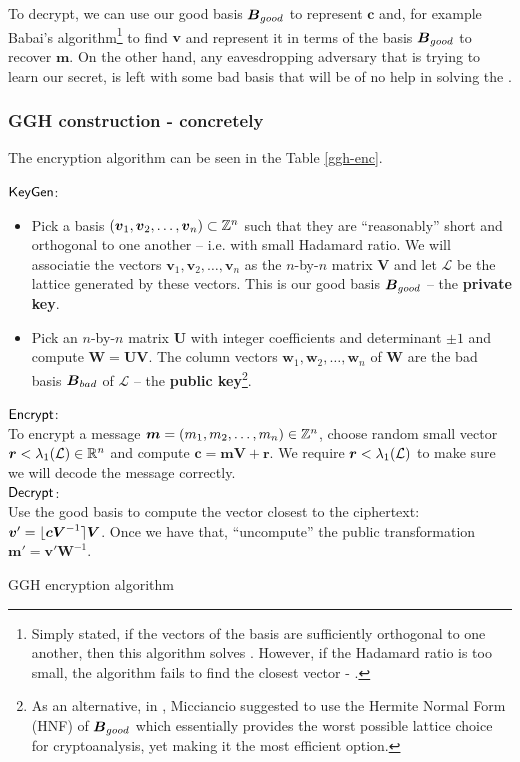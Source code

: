 To decrypt, we can use our good basis $\boldsymbol{B}_{good}$ to represent $\bm{c}$ and, for example Babai's algorithm\footnote{Simply stated, if the vectors of the basis are sufficiently orthogonal to one another, then this algorithm solves . However, if the Hadamard ratio is too small, the algorithm fails to find the closest vector - \cite{book}.} to find $\bm{v}$ and represent it in terms of the basis $\boldsymbol{B}_{good}$ to recover $\bm{m}$. On the other hand, any eavesdropping adversary that is trying to learn our secret, is left with some bad basis that will be of no help in solving the .

\subsubsection*{GGH construction - concretely}
The encryption algorithm can be seen in the Table \ref{ggh-enc}.
\begin{table}[ht]
	\centering
	\begin{mdframed}
$\textsf{KeyGen}$:
\begin{itemize}
    \item Pick a basis $(\boldsymbol{v}_1, \boldsymbol{v}_2, \dots, \boldsymbol{v}_n) \subset \mathbb{Z}^n$ such that they are ``reasonably'' short and orthogonal to one another -- i.e. with small Hadamard ratio. We will associatie the vectors $\bm{v}_1, \bm{v}_2, \dots, \bm{v}_n$ as the $n$-by-$n$ matrix $\bm{V}$ and let $\mathcal{L}$ be the lattice generated by these vectors. This is our good basis $\boldsymbol{B}_{good}$ -- the \textbf{private key}.
    \item Pick an $n$-by-$n$ matrix $\bm{U}$ with integer coefficients and determinant $\pm 1$ and compute $\bm{W} = \bm{UV}$. The column vectors $\bm{w}_1, \bm{w}_2, \dots, \bm{w}_n$ of $\bm{W}$ are the bad basis $\boldsymbol{B}_{bad}$ of $\mathcal{L}$ -- the \textbf{public key}\footnote{As an alternative, in \cite{hnf}, Micciancio suggested to use the Hermite Normal Form (HNF) of $\boldsymbol{B}_{good}$ which essentially provides the worst possible lattice choice for cryptoanalysis, yet making it the most efficient option.}.
\end{itemize}
$\textsf{Encrypt}$:\\
To encrypt a message $\boldsymbol{m} = (m_1, m_2, \dots, m_n) \in \mathbb{Z}^n$, choose random small vector $\boldsymbol{r} < \lambda_1(\mathcal{L}) \in \mathbb{R}^n$  and compute $\bm{c} = \bm{mV} + \bm{r}$. We require $\boldsymbol{r} < \lambda_1(\mathcal{L})$ to make sure we will decode the message correctly.\\
$\textsf{Decrypt}$:\\
Use the good basis to compute the vector closest to the ciphertext: $\boldsymbol{v}' = \lfloor \boldsymbol{cV}^{-1} \rceil\boldsymbol{V}$. Once we have that, ``uncompute'' the public transformation $\bm{m}' = \bm{v}'\bm{W}^{-1}$.
\end{mdframed}
\caption{GGH encryption algorithm}
\label{ggh-enc}
\end{table}



